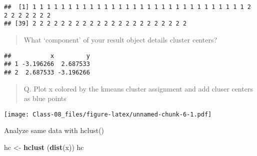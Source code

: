 \documentclass[]{article}
\newenvironment{Shaded}{\begin{snugshade}}{\end{snugshade}}
\newcommand{\DataTypeTok}[1]{\textcolor[rgb]{0.13,0.29,0.53}{#1}}
\newcommand{\DecValTok}[1]{\textcolor[rgb]{0.00,0.00,0.81}{#1}}
\newcommand{\KeywordTok}[1]{\textcolor[rgb]{0.13,0.29,0.53}{\textbf{#1}}}
\newcommand{\NormalTok}[1]{#1}
\newcommand{\OperatorTok}[1]{\textcolor[rgb]{0.81,0.36,0.00}{\textbf{#1}}}
\newcommand{\StringTok}[1]{\textcolor[rgb]{0.31,0.60,0.02}{#1}}
\begin{document}
\begin{Shaded}
\end{Shaded}

\begin{verbatim}
##  [1] 1 1 1 1 1 1 1 1 1 1 1 1 1 1 1 1 1 1 1 1 1 1 1 1 1 1 1 1 1 1 2 2 2 2 2 2 2 2
## [39] 2 2 2 2 2 2 2 2 2 2 2 2 2 2 2 2 2 2 2 2 2 2
\end{verbatim}

\begin{quote}
What `component' of your result object details cluster centers?
\end{quote}

\begin{Shaded}
\end{Shaded}

\begin{verbatim}
##           x         y
## 1 -3.196266  2.687533
## 2  2.687533 -3.196266
\end{verbatim}

\begin{quote}
Q. Plot x colored by the kmeans cluster assignment and add cluser
centers as blue points
\end{quote}

\begin{Shaded}
\end{Shaded}

\texttt{[image: Class-08\_files/figure-latex/unnamed-chunk-6-1.pdf]}

Analyze same data with hclust()

\begin{Shaded}
\begin{Highlighting}[]
\NormalTok{hc <-}\StringTok{ }\KeywordTok{hclust}\NormalTok{ (}\KeywordTok{dist}\NormalTok{(x))}
\NormalTok{hc}
\end{Highlighting}
\end{Shaded}
\end{document}
